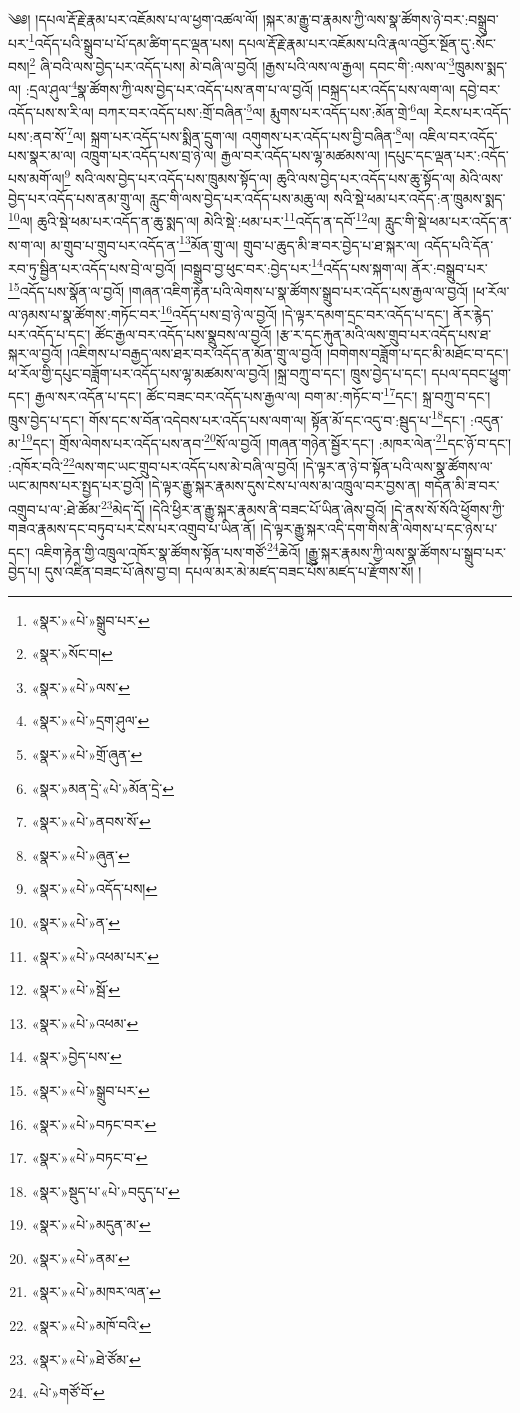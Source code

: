 ༄༅། །དཔལ་རྡོ་རྗེ་རྣམ་པར་འཇོམས་པ་ལ་ཕྱག་འཚལ་ལོ། །སྐར་མ་རྒྱུ་བ་རྣམས་ཀྱི་ལས་སྣ་ཚོགས་ཉེ་བར་:བསྒྲུབ་པར་\footnote{«སྣར་»«པེ་»སྒྲུབ་པར་}འདོད་པའི་སྒྲུབ་པ་པོ་དམ་ཚིག་དང་ལྡན་པས། དཔལ་རྡོ་རྗེ་རྣམ་པར་འཇོམས་པའི་རྣལ་འབྱོར་སྔོན་དུ་:སོང་བས།\footnote{«སྣར་»སོང་བ།} ཞི་བའི་ལས་བྱེད་པར་འདོད་པས། མེ་བཞི་ལ་བྱའོ། །རྒྱས་པའི་ལས་ལ་རྒྱལ། དབང་གི་:ལས་ལ་\footnote{«སྣར་»«པེ་»ལས་}ཁྲུམས་སྨད་ལ། :དྲལ་ཤུལ་\footnote{«སྣར་»«པེ་»དྲག་ཤུལ་}སྣ་ཚོགས་ཀྱི་ལས་བྱེད་པར་འདོད་པས་ནག་པ་ལ་བྱའོ། །བསྐྲད་པར་འདོད་པས་ལག་ལ། དབྱེ་བར་འདོད་པས་ས་རི་ལ། བཀར་བར་འདོད་པས་:གྲོ་བཞིན་\footnote{«སྣར་»«པེ་»གྲོ་ཞུན་}ལ། རྨུགས་པར་འདོད་པས་:མོན་གྲེ་\footnote{«སྣར་»མན་དྲེ་«པེ་»མོན་དྲེ་}ལ། རེངས་པར་འདོད་པས་:ནབ་སོ་\footnote{«སྣར་»«པེ་»ནབས་སོ་}ལ། སྐྲག་པར་འདོད་པས་སྨིན་དྲུག་ལ། འགུགས་པར་འདོད་པས་བྱི་བཞིན་\footnote{«སྣར་»«པེ་»ཞུན་}ལ། འཇིལ་བར་འདོད་པས་སྣར་མ་ལ། འཁྲུག་པར་འདོད་པས་བྲ་ཉེ་ལ། རྒྱལ་བར་འདོད་པས་ལྷ་མཚམས་ལ། །དཔུང་དང་ལྡན་པར་:འདོད་པས་མགོ་ལ།\footnote{«སྣར་»«པེ་»འདོད་པས།} སའི་ལས་བྱེད་པར་འདོད་པས་ཁྲུམས་སྟོད་ལ། ཆུའི་ལས་བྱེད་པར་འདོད་པས་ཆུ་སྟོད་ལ། མེའི་ལས་བྱེད་པར་འདོད་པས་ནམ་གྲུ་ལ། རླུང་གི་ལས་བྱེད་པར་འདོད་པས་མཆུ་ལ། སའི་སྡེ་ཕམ་པར་འདོད་:ན་ཁྲུམས་སྨད་\footnote{«སྣར་»«པེ་»ན་}ལ། ཆུའི་སྡེ་ཕམ་པར་འདོད་ན་ཆུ་སྨད་ལ། མེའི་སྡེ་:ཕམ་པར་\footnote{«སྣར་»«པེ་»འཕམ་པར་}འདོད་ན་དབོ་\footnote{«སྣར་»«པེ་»སྦོ་}ལ། རླུང་གི་སྡེ་ཕམ་པར་འདོད་ན་ས་ག་ལ། མ་གྲུབ་པ་གྲུབ་པར་འདོད་ན་\footnote{«སྣར་»«པེ་»འཕམ་}མོན་གྲུ་ལ། གྲུབ་པ་ཆུད་མི་ཟ་བར་བྱེད་པ་ཐ་སྐར་ལ། འདོད་པའི་དོན་རབ་ཏུ་སྦྱིན་པར་འདོད་པས་བྲེ་ལ་བྱའོ། །བསྒྲུབ་བྱ་ཕུང་བར་:བྱེད་པར་\footnote{«སྣར་»བྱེད་པས་}འདོད་པས་སྐག་ལ། ནོར་:བསྒྲུབ་པར་\footnote{«སྣར་»«པེ་»སྒྲུབ་པར་}འདོད་པས་སྣོན་ལ་བྱའོ། །གཞན་འཇིག་རྟེན་པའི་ལེགས་པ་སྣ་ཚོགས་སྒྲུབ་པར་འདོད་པས་རྒྱལ་ལ་བྱའོ། །ཕ་རོལ་ལ་ཉམས་པ་སྣ་ཚོགས་:གཏོང་བར་\footnote{«སྣར་»«པེ་»བཏང་བར་}འདོད་པས་བྲ་ཉེ་ལ་བྱའོ། །དེ་ལྟར་དམག་དྲང་བར་འདོད་པ་དང་། ནོར་རྙེད་པར་འདོད་པ་དང་། ཚོང་རྒྱལ་བར་འདོད་པས་སྣྲུབས་ལ་བྱའོ། །རྩ་ར་དང་རྐུན་མའི་ལས་གྲུབ་པར་འདོད་པས་ཐ་སྐར་ལ་བྱའོ། །འཇིགས་པ་བརྒྱད་ལས་ཐར་བར་འདོད་ན་མོན་གྲུ་ལ་བྱའོ། །བགེགས་བཟློག་པ་དང་མི་མཐོང་བ་དང་། ཕ་རོལ་གྱི་དཔུང་བཟློག་པར་འདོད་པས་ལྷ་མཚམས་ལ་བྱའོ། །སྐྲ་བཀྲུ་བ་དང་། ཁྲུས་བྱེད་པ་དང་། དཔལ་དབང་ཕྱུག་དང་། རྒྱལ་སར་འདོན་པ་དང་། ཚོང་བཟང་བར་འདོད་པས་རྒྱལ་ལ། བག་མ་:གཏོང་བ་\footnote{«སྣར་»«པེ་»བཏང་བ་}དང་། སྐྲ་བཀྲུ་བ་དང་། ཁྲུས་བྱེད་པ་དང་། གོས་དང་ས་བོན་འདེབས་པར་འདོད་པས་ལག་ལ། སྟོན་མོ་དང་འདུ་བ་:སྦུད་པ་\footnote{«སྣར་»སྡུད་པ་«པེ་»བདུད་པ་}དང་། :འདུན་མ་\footnote{«སྣར་»«པེ་»མདུན་མ་}དང་། གྲོས་ལེགས་པར་འདོད་པས་ནབ་\footnote{«སྣར་»«པེ་»ནམ་}སོ་ལ་བྱའོ། །གཞན་གཉེན་སྦྱོར་དང་། :མཁར་ལེན་\footnote{«སྣར་»«པེ་»མཁར་ལན་}དང་ཉོ་བ་དང་། :འཁོར་བའི་\footnote{«སྣར་»«པེ་»མཁོ་བའི་}ལས་གང་ཡང་གྲུབ་པར་འདོད་པས་མེ་བཞི་ལ་བྱའོ། །དེ་ལྟར་ན་ཉེ་བ་སྟོན་པའི་ལས་སྣ་ཚོགས་ལ་ཡང་མཁས་པར་སྤྱད་པར་བྱའོ། །དེ་ལྟར་རྒྱུ་སྐར་རྣམས་དུས་ངེས་པ་ལས་མ་འཁྲུལ་བར་བྱས་ན། གདོན་མི་ཟ་བར་འགྲུབ་པ་ལ་:ཐེ་ཚོམ་\footnote{«སྣར་»«པེ་»ཐེ་ཙོམ་}མེད་དོ། །དེའི་ཕྱིར་ན་རྒྱུ་སྐར་རྣམས་ནི་བཟང་པོ་ཡིན་ཞེས་བྱའོ། །དེ་ནས་སོ་སོའི་ཕྱོགས་ཀྱི་གཟའ་རྣམས་དང་བཏུབ་པར་ངེས་པར་འགྲུབ་པ་ཡིན་ནོ། །དེ་ལྟར་རྒྱུ་སྐར་འདི་དག་གིས་ནི་ལེགས་པ་དང་ཉེས་པ་དང་། འཇིག་རྟེན་གྱི་འཁྲུལ་འཁོར་སྣ་ཚོགས་སྟོན་པས་གཙོ་\footnote{«པེ་»གཙོ་བོ་}ཆེའོ། །རྒྱུ་སྐར་རྣམས་ཀྱི་ལས་སྣ་ཚོགས་པ་སྒྲུབ་པར་བྱེད་པ། དུས་འཛིན་བཟང་པོ་ཞེས་བྱ་བ། དཔལ་མར་མེ་མཛད་བཟང་པོས་མཛད་པ་རྫོགས་སོ། ། 